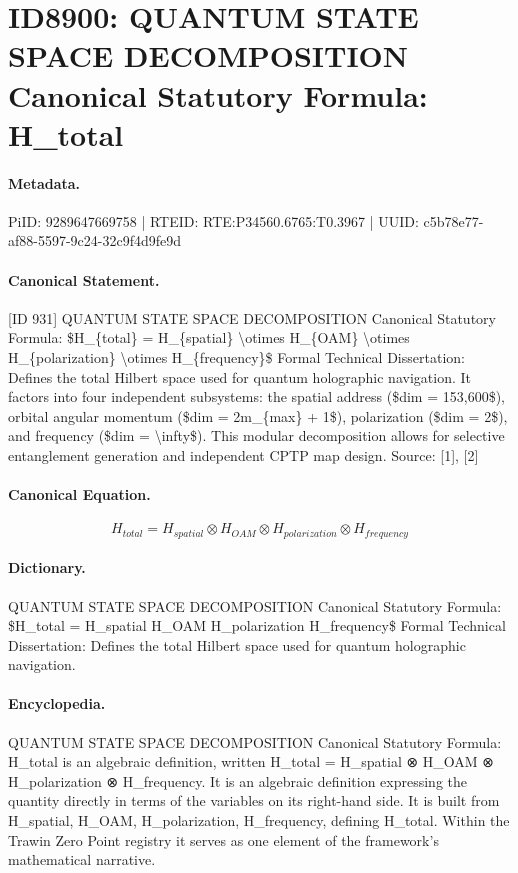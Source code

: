 \section*{ID8900: QUANTUM STATE SPACE DECOMPOSITION Canonical Statutory Formula: H\_total}
\paragraph{Metadata.}
PiID: 9289647669758 | RTEID: RTE:P34560.6765:T0.3967 | UUID: c5b78e77-af88-5597-9c24-32c9f4d9fe9d

\paragraph{Canonical Statement.}
[ID 931] QUANTUM STATE SPACE DECOMPOSITION Canonical Statutory Formula: \$H\_\{total\} = H\_\{spatial\} \textbackslash{}otimes H\_\{OAM\} \textbackslash{}otimes H\_\{polarization\} \textbackslash{}otimes H\_\{frequency\}\$ Formal Technical Dissertation: Defines the total Hilbert space used for quantum holographic navigation. It factors into four independent subsystems: the spatial address (\$dim = 153,600\$), orbital angular momentum (\$dim = 2m\_\{max\} + 1\$), polarization (\$dim = 2\$), and frequency (\$dim = \textbackslash{}infty\$). This modular decomposition allows for selective entanglement generation and independent CPTP map design. Source: [1], [2]

\paragraph{Canonical Equation.}
\[
H_{total} = H_{spatial} \otimes H_{OAM} \otimes H_{polarization} \otimes H_{frequency}
\]

\paragraph{Dictionary.}
QUANTUM STATE SPACE DECOMPOSITION Canonical Statutory Formula: \$H\_total = H\_spatial H\_OAM H\_polarization H\_frequency\$ Formal Technical Dissertation: Defines the total Hilbert space used for quantum holographic navigation.

\paragraph{Encyclopedia.}
QUANTUM STATE SPACE DECOMPOSITION Canonical Statutory Formula: H\_total is an algebraic definition, written H\_total = H\_spatial ⊗ H\_OAM ⊗ H\_polarization ⊗ H\_frequency. It is an algebraic definition expressing the quantity directly in terms of the variables on its right-hand side. It is built from H\_spatial, H\_OAM, H\_polarization, H\_frequency, defining H\_total. Within the Trawin Zero Point registry it serves as one element of the framework's mathematical narrative.
